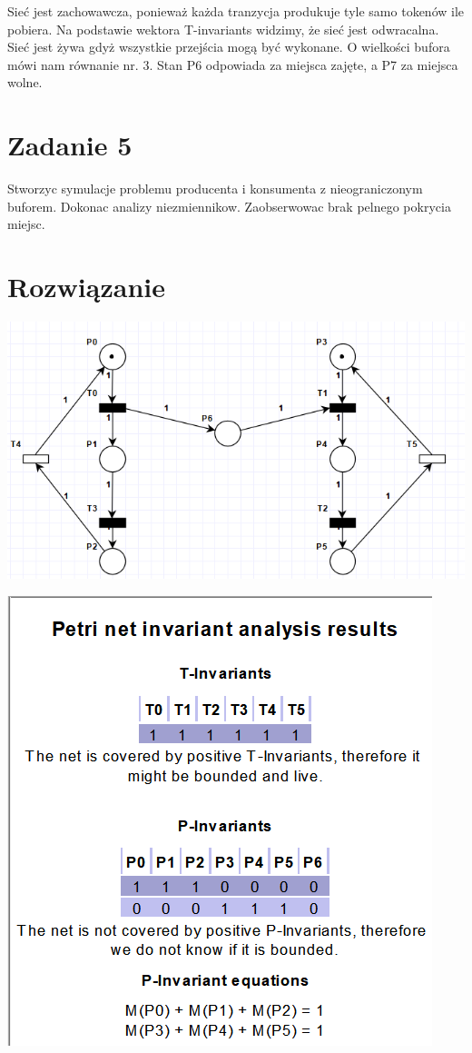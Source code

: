 \documentclass[12pt]{article}
\begin{document}
Sieć jest zachowawcza, ponieważ każda tranzycja produkuje tyle samo tokenów ile pobiera. Na podstawie wektora T-invariants widzimy, że sieć jest odwracalna. Sieć jest żywa gdyż wszystkie przejścia mogą być wykonane. O wielkości bufora mówi nam równanie nr. 3. Stan P6 odpowiada za miejsca zajęte, a P7 za miejsca wolne.

\section{Zadanie 5}
Stworzyc symulacje problemu producenta i konsumenta z nieograniczonym buforem. Dokonac analizy niezmiennikow. Zaobserwowac brak pelnego pokrycia miejsc.

\section{Rozwiązanie}
\begin{center}
\centering
    \includegraphics{zad5_init.png}
\end{center}
\begin{center}
\centering
    \includegraphics{zad5_invariant.png}
\end{center}
\end{document}
